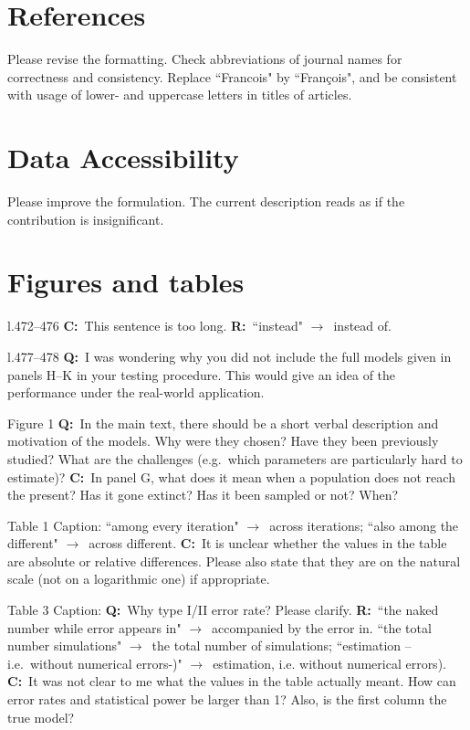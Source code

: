 \documentclass[11pt]{article}
\newenvironment{my_description}
{\begin{description}
  \setlength{\itemsep}{2pt}
  \setlength{\parskip}{0pt}
  \setlength{\parsep}{0pt}}
{\end{description}}
\newcommand{\ra}{$\rightarrow$\ }
\newcommand{\C}{\textbf{C:}\ }
\newcommand{\Q}{\textbf{Q:}\ }
\newcommand{\R}{\textbf{R:}\ }
\begin{document}
\section{References}
Please revise the formatting. Check abbreviations of journal names for correctness and consistency. Replace ``Francois" by ``Fran\c{c}ois", and be consistent with usage of lower- and uppercase letters in titles of articles.

\section{Data Accessibility}
Please improve the formulation. The current description reads as if the contribution is insignificant.

\section{Figures and tables}
\begin{my_description}
	\item[l.472--476] \C This sentence is too long. \R ``instead" \ra instead of.
	\item[l.477--478] \Q I was wondering why you did not include the full models given in panels H--K in your testing procedure. This would give an idea of the performance under the real-world application.
	\item[Figure 1] \Q In the main text, there should be a short verbal description and motivation of the models. Why were they chosen? Have they been previously studied? What are the challenges (e.g.\ which parameters are particularly hard to estimate)? \C In panel G, what does it mean when a population does not reach the present? Has it gone extinct? Has it been sampled or not? When?
	\item[Table 1] Caption: ``among every iteration" \ra across iterations; ``also among the different" \ra across different. \C It is unclear whether the values in the table are absolute or relative differences. Please also state that they are on the natural scale (not on a logarithmic one) if appropriate.
	\item[Table 3] Caption: \Q Why type I/II error rate? Please clarify. \R ``the naked number while error appears in" \ra accompanied by the error in. ``the total number simulations" \ra the total number of simulations; ``estimation --i.e.\ without numerical errors-)" \ra estimation, i.e. without numerical errors). \C It was not clear to me what the values in the table actually meant. How can error rates and statistical power be larger than 1? Also, is the first column the true model?
\end{my_description}




\end{document}
